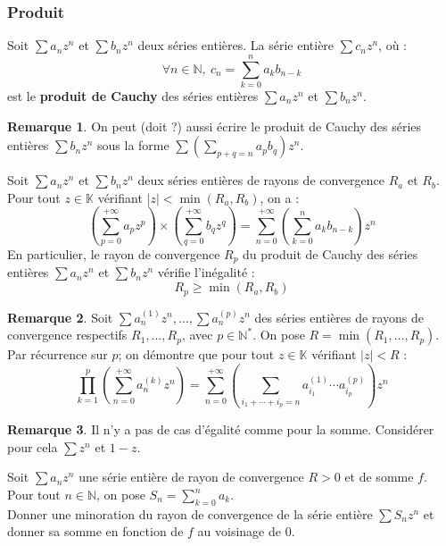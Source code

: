 \documentclass[french]{article}
\newcommand{\N}{\mathbb{N}}
\newcommand{\K}{\mathbb{K}}
\newcommand{\st}{^*}
\theoremstyle{plain}
\theoremstyle{definition}
\newtheorem*{rmq}{Remarque}
\theoremstyle{remark}
\begin{document}
\subsubsection*{Produit}

\begin{dfn}
	Soit $\displaystyle\sum a_nz^n$ et $\displaystyle\sum b_nz^n$ deux séries entières. La série entière $\displaystyle\sum c_nz^n$, où : $$\forall n\in\N,\ c_n=\sum_{k=0}^{n}a_kb_{n-k}$$ est le \textbf{produit de Cauchy} des séries entières $\displaystyle\sum a_nz^n$ et $\displaystyle\sum b_nz^n$.
\end{dfn}

\begin{rmq}
	On peut (doit ?) aussi écrire le produit de Cauchy des séries entières $\displaystyle\sum b_nz^n$ sous la forme $\displaystyle\sum\left(\sum_{p+q=n}a_pb_q\right)z^n$.
\end{rmq}

\begin{prop}%
	Soit $\displaystyle\sum a_nz^n$ et $\displaystyle\sum b_nz^n$ deux séries entières de rayons de convergence $R_a$ et $R_b$. \\
	Pour tout $z\in\K$ vérifiant $\lvert z\rvert <\min(R_a,R_b)$, on a : $$\left(\sum_{p=0}^{+\infty}a_pz^p\right)\times \left(\sum_{q=0}^{+\infty}b_qz^q\right)=\sum_{n=0}^{+\infty}\left(\sum_{k=0}^{n}a_kb_{n-k}\right)z^n$$ En particulier, le rayon de convergence $R_p$ du produit de Cauchy des séries entières $\displaystyle\sum a_nz^n$ et $\displaystyle\sum b_nz^n$ vérifie l'inégalité : $$R_p\geqslant\min(R_a,R_b)$$
\end{prop}

\begin{rmq}
	Soit $\displaystyle\sum a_n^{(1)}z^n,\ldots,\sum a_n^{(p)}z^n$ des séries entières de rayons de convergence respectifs $R_1,\ldots,R_p$, avec $p\in\N\st$. On pose $R=\min(R_1,\ldots,R_p)$. \\
	Par récurrence sur $p$; on démontre que pour tout $z\in\K$ vérifiant $\lvert z\rvert <R$ :
	$$\prod_{k=1}^{p}\left(\sum_{n=0}^{+\infty}a_n^{(k)}z^n\right)=\sum_{n=0}^{+\infty}\left(\sum_{i_1+\cdots+i_p=n}a_{i_1}^{(1)}\cdots a_{i_p}^{(p)}\right)z^n$$
\end{rmq}

\begin{rmq}
	Il n'y a pas de cas d'égalité comme pour la somme. Considérer pour cela $\displaystyle\sum z^n$ et $1-z$.
\end{rmq}

\begin{exo}
	Soit $\displaystyle\sum a_nz^n$ une série entière de rayon de convergence $R>0$ et de somme $f$. Pour tout $n\in\N$, on pose $S_n=\displaystyle\sum_{k=0}^{n}a_k$. \\
	Donner une minoration du rayon de convergence de la série entière $\displaystyle\sum S_nz^n$ et donner sa somme en fonction de $f$ au voisinage de $0$.
\end{exo}
\end{document}
